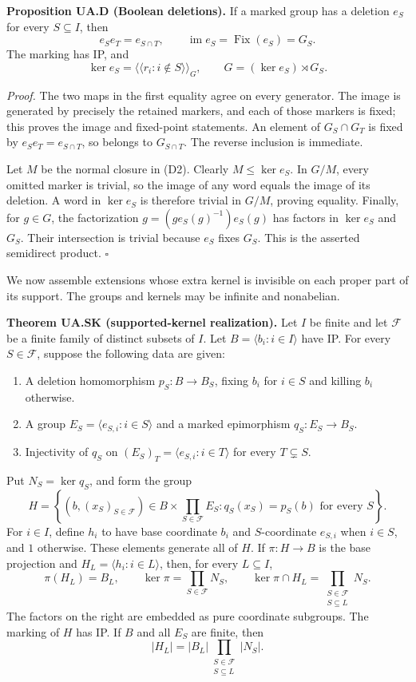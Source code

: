 \textbf{Proposition UA.D (Boolean deletions).} If a marked group has a deletion \(e_S\) for every \(S\subseteq I\), then
\[
e_Se_T=e_{S\cap T},\qquad \operatorname{im}e_S=\operatorname{Fix}(e_S)=G_S.
\tag{D1}
\]
The marking has IP, and
\[
\ker e_S=\langle\!\langle r_i:i\notin S\rangle\!\rangle_G,
\qquad G=(\ker e_S)\rtimes G_S.
\tag{D2}
\]

\emph{Proof.} The two maps in the first equality agree on every generator. The image is generated by precisely the retained markers, and each of those markers is fixed; this proves the image and fixed-point statements. An element of \(G_S\cap G_T\) is fixed by \(e_Se_T=e_{S\cap T}\), so belongs to \(G_{S\cap T}\). The reverse inclusion is immediate.

Let \(M\) be the normal closure in (D2). Clearly \(M\leq\ker e_S\). In \(G/M\), every omitted marker is trivial, so the image of any word equals the image of its deletion. A word in \(\ker e_S\) is therefore trivial in \(G/M\), proving equality. Finally, for \(g\in G\), the factorization \(g=(g e_S(g)^{-1})e_S(g)\) has factors in \(\ker e_S\) and \(G_S\). Their intersection is trivial because \(e_S\) fixes \(G_S\). This is the asserted semidirect product. \(\square\)

We now assemble extensions whose extra kernel is invisible on each proper part of its support. The groups and kernels may be infinite and nonabelian.

\textbf{Theorem UA.SK (supported-kernel realization).} Let \(I\) be finite and let \(\mathcal F\) be a finite family of distinct subsets of \(I\). Let \(B=\langle b_i:i\in I\rangle\) have IP. For every \(S\in\mathcal F\), suppose the following data are given:

\begin{enumerate}
\def\labelenumi{\arabic{enumi}.}
\tightlist
\item
  A deletion homomorphism \(p_S:B\to B_S\), fixing \(b_i\) for \(i\in S\) and killing \(b_i\) otherwise.
\item
  A group \(E_S=\langle e_{S,i}:i\in S\rangle\) and a marked epimorphism \(q_S:E_S\to B_S\).
\item
  Injectivity of \(q_S\) on \((E_S)_T=\langle e_{S,i}:i\in T\rangle\) for every \(T\subsetneq S\).
\end{enumerate}

Put \(N_S=\ker q_S\), and form the group
\[
H=\left\{(b,(x_S)_{S\in\mathcal F})\in
B\times\prod_{S\in\mathcal F}E_S:
q_S(x_S)=p_S(b)\text{ for every }S\right\}.
\tag{K1}
\]
For \(i\in I\), define \(h_i\) to have base coordinate \(b_i\) and \(S\)-coordinate \(e_{S,i}\) when \(i\in S\), and \(1\) otherwise. These elements generate all of \(H\). If \(\pi:H\to B\) is the base projection and \(H_L=\langle h_i:i\in L\rangle\), then, for every \(L\subseteq I\),
\[
\pi(H_L)=B_L,\qquad
\ker\pi=\prod_{S\in\mathcal F}N_S,\qquad
\ker\pi\cap H_L=\prod_{\substack{S\in\mathcal F\\S\subseteq L}}N_S.
\tag{K2}
\]
The factors on the right are embedded as pure coordinate subgroups. The marking of \(H\) has IP. If \(B\) and all \(E_S\) are finite, then
\[
|H_L|=|B_L|\prod_{\substack{S\in\mathcal F\\S\subseteq L}}|N_S|.
\tag{K3}
\]

